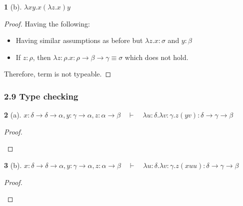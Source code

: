 \documentclass[12pt, a4paper]{article}
\newcommand{\deriv}{\quad\vdash\quad}
\newtheorem*{exercise}{}
\begin{document}
\begin{exercise}[b]
    $\lambda xy. x(\lambda z. x)y$
\end{exercise}
\begin{proof}
    Having the following:
    \begin{itemize}
        \item Having similar assumptions as before but $\lambda z. x : \sigma$ and $y : \beta$
        \item If $z : \rho$, then $\lambda z : \rho. x : \rho \to \beta \to \gamma \equiv \sigma$ which does not hold.
    \end{itemize}
    Therefore, term is not typeable.
\end{proof}

\subsubsection{2.9 Type checking}
\begin{exercise}[a]
    $x : \delta \to \delta \to \alpha, y : \gamma \to \alpha, z : \alpha \to \beta \deriv \lambda u : \delta . \lambda v : \gamma . z(yv) : \delta \to \gamma \to \beta$
\end{exercise}
\begin{proof}
  \begin{flagderiv}
  \end{flagderiv}
\end{proof}

\begin{exercise}[b]
    $x : \delta \to \delta \to \alpha, y : \gamma \to \alpha, z : \alpha \to \beta \deriv \lambda u : \delta . \lambda v : \gamma . z(xuu) : \delta \to \gamma \to \beta$
\end{exercise}
\begin{proof}
  \begin{flagderiv}
  \end{flagderiv}
\end{proof}




\end{document}

